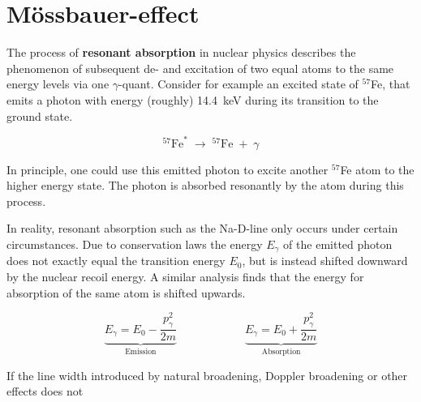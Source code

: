 
\section{Mössbauer-effect}
\label{sec:mössbauer-effect}

The process of \textbf{resonant absorption} in nuclear physics describes the 
phenomenon of subsequent de- and excitation of two equal atoms to the same energy 
levels via one $\gamma$-quant. Consider for example an excited state of $^{57}$Fe,
that emits a photon with energy (roughly) \SI{14.4}{\kilo\electronvolt} during its 
transition to the ground state.

\begin{equation*}
^{57}\text{Fe}^*\;\longrightarrow\;^{57}\text{Fe}\;+\;\gamma  
\end{equation*}

In principle, one could use this emitted photon to excite another $^{57}$Fe atom to 
the higher energy state. The photon is absorbed resonantly by the atom during this 
process.

In reality, resonant absorption such as the Na-D-line only occurs under certain
circumstances. Due to conservation laws the energy $E_\gamma$ of the emitted photon
does not exactly equal the transition energy $E_0$, but is instead shifted downward
by the nuclear recoil energy. A similar analysis finds that the energy for absorption
of the same atom is shifted upwards. 

\begin{equation}
\underbrace{E_\gamma = E_0 - \frac{p_\gamma^2}{2m}}_\text{Emission} \qquad\qquad\qquad \underbrace{E_\gamma = E_0 + \frac{p_\gamma^2}{2m}}_\text{Absorption} 
\end{equation}

If the line width introduced by natural broadening, Doppler broadening or other 
effects does not 
